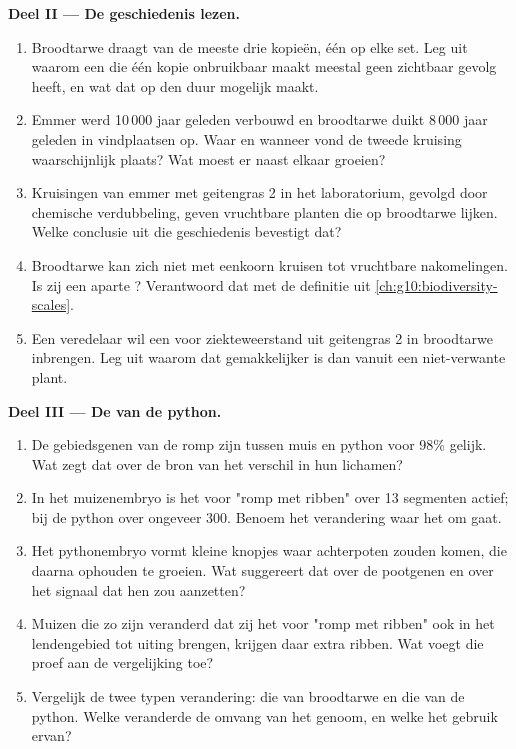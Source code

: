 \begin{problem}
\medskip
\noindent\textbf{Deel II --- De geschiedenis lezen.}
\begin{enumerate}[resume]
  \item Broodtarwe draagt van de meeste  drie kopieën, één op elke
        set. Leg uit waarom een  die één kopie onbruikbaar maakt
        meestal geen zichtbaar gevolg heeft, en wat dat op den duur
        mogelijk maakt.
  \item Emmer werd 10\,000 jaar geleden verbouwd en broodtarwe duikt
        8\,000 jaar geleden in vindplaatsen op. Waar en wanneer vond de
        tweede kruising waarschijnlijk plaats? Wat moest er naast elkaar
        groeien?
  \item Kruisingen van emmer met geitengras 2 in het laboratorium,
        gevolgd door chemische verdubbeling, geven vruchtbare planten die
        op broodtarwe lijken. Welke conclusie uit die geschiedenis
        bevestigt dat?
  \item Broodtarwe kan zich niet met eenkoorn kruisen tot vruchtbare
        nakomelingen. Is zij een aparte ? Verantwoord dat met de
        definitie uit \cref{ch:g10:biodiversity-scales}.
  \item Een veredelaar wil een  voor ziekteweerstand uit geitengras 2
        in broodtarwe inbrengen. Leg uit waarom dat gemakkelijker is dan
        vanuit een niet-verwante plant.
\end{enumerate}

\medskip
\noindent\textbf{Deel III --- De  van de python.}
\begin{enumerate}[resume]
  \item De gebiedsgenen van de romp zijn tussen muis en python voor 98\%
        gelijk. Wat zegt dat over de bron van het verschil in hun
        lichamen?
  \item In het muizenembryo is het  voor "romp met ribben" over 13
        segmenten actief; bij de python over ongeveer 300. Benoem het
         verandering waar het om gaat.
  \item Het pythonembryo vormt kleine knopjes waar achterpoten zouden
        komen, die daarna ophouden te groeien. Wat suggereert dat over de
        pootgenen en over het signaal dat hen zou aanzetten?
  \item Muizen die zo zijn veranderd dat zij het  voor "romp met
        ribben" ook in het lendengebied tot uiting brengen, krijgen daar
        extra ribben. Wat voegt die proef aan de vergelijking toe?
  \item Vergelijk de twee typen verandering: die van broodtarwe en die
        van de python. Welke veranderde de omvang van het genoom, en
        welke het gebruik ervan?
\end{enumerate}


\end{problem}
